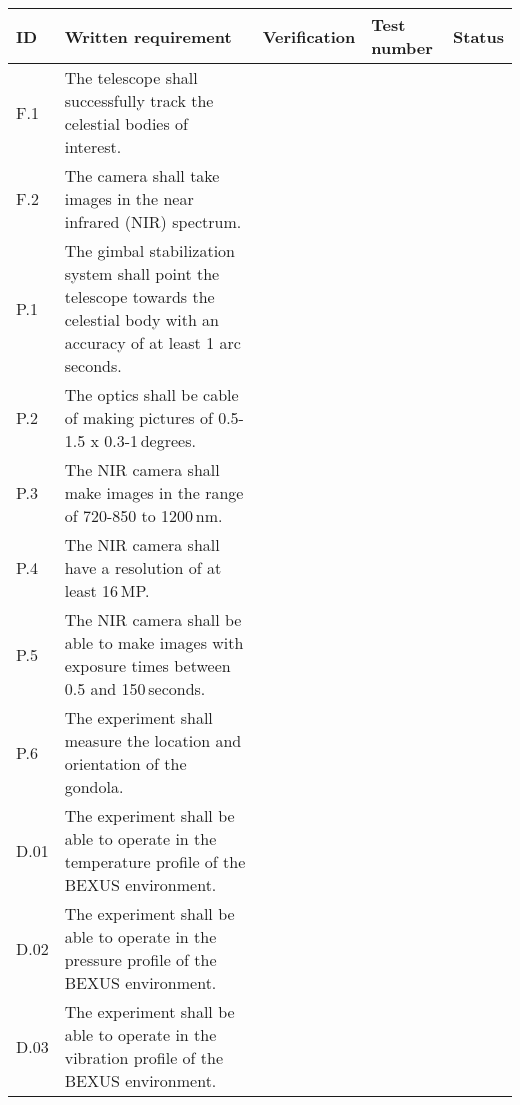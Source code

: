 
\makeatletter
\renewcommand\@makefntext[1]{\leftskip=3em\hskip-1em\@makefnmark#1}
\makeatother

\begin{longtable}[]{|m{}| m{} |m{} |m{}|m{}|}

\hline
\textbf{ID} & \textbf{Written requirement} & \textbf{Verification} & \textbf{Test number} & \textbf{Status} \\\hline
F.1 & The telescope shall successfully track the celestial bodies of interest. 
& & & \\\hline

F.2 & The camera shall take images in the near infrared (NIR) spectrum.
& & & \\\hline

P.1 & The gimbal stabilization system shall point the telescope towards the celestial body with an accuracy of at least 1 arc seconds.
& & & \\\hline

P.2 & The optics shall be cable of making pictures of 0.5-1.5 x 0.3-1\,degrees.
& & & \\\hline

P.3 & The NIR camera shall make images in the range of 720-850 to 1200\,nm.
& & & \\\hline

P.4 & The NIR camera shall have a resolution of at least 16\,MP.
& & & \\\hline

P.5 & The NIR camera shall be able to make images with exposure times between 0.5 and 150\,seconds.
& & & \\\hline

P.6 & The experiment shall measure the location and orientation of the gondola.
& & & \\\hline

D.01 & The experiment shall be able to operate in the temperature profile of the BEXUS environment.
& & & \\\hline

D.02 & The experiment shall be able to operate in the pressure profile of the BEXUS environment.
& & & \\\hline

D.03 & The experiment shall be able to operate in the vibration profile of the BEXUS environment.
& & & \\\hline


\end{longtable}
